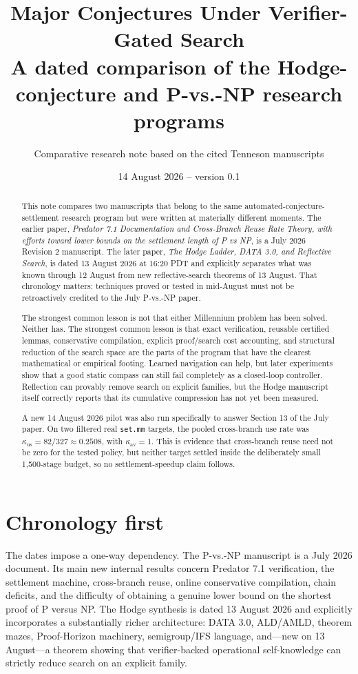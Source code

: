 \documentclass[11pt]{article}
\title{\textbf{Major Conjectures Under Verifier-Gated Search}\\[0.3em]
\large A dated comparison of the Hodge-conjecture and P-vs.-NP research programs}
\author{Comparative research note based on the cited Tenneson manuscripts}
\date{14 August 2026 -- version 0.1}
\newcommand{\kuse}{\kappa_{\mathrm{us}}}
\newcommand{\kav}{\kappa_{\mathrm{av}}}
\begin{document}
\maketitle

\begin{abstract}
This note compares two manuscripts that belong to the same automated-conjecture-settlement research program but were written at materially different moments.  The earlier paper, \emph{Predator 7.1 Documentation and Cross-Branch Reuse Rate Theory, with efforts toward lower bounds on the settlement length of P vs NP}, is a July 2026 Revision 2 manuscript.  The later paper, \emph{The Hodge Ladder, DATA 3.0, and Reflective Search}, is dated 13 August 2026 at 16:20 PDT and explicitly separates what was known through 12 August from new reflective-search theorems of 13 August.  That chronology matters: techniques proved or tested in mid-August must not be retroactively credited to the July P-vs.-NP paper.

The strongest common lesson is not that either Millennium problem has been solved.  Neither has.  The strongest common lesson is that exact verification, reusable certified lemmas, conservative compilation, explicit proof/search cost accounting, and structural reduction of the search space are the parts of the program that have the clearest mathematical or empirical footing.  Learned navigation can help, but later experiments show that a good static compass can still fail completely as a closed-loop controller.  Reflection can provably remove search on explicit families, but the Hodge manuscript itself correctly reports that its cumulative compression has not yet been measured.

A new 14 August 2026 pilot was also run specifically to answer Section 13 of the July paper.  On two filtered real \texttt{set.mm} targets, the pooled cross-branch use rate was \(\kuse=82/327\approx0.2508\), with \(\kav=1\).  This is evidence that cross-branch reuse need not be zero for the tested policy, but neither target settled inside the deliberately small 1,500-stage budget, so no settlement-speedup claim follows.
\end{abstract}

\section{Chronology first}

The dates impose a one-way dependency.  The P-vs.-NP manuscript is a July 2026 document.  Its main new internal results concern Predator 7.1 verification, the settlement machine, cross-branch reuse, online conservative compilation, chain deficits, and the difficulty of obtaining a genuine lower bound on the shortest proof of P versus NP.  The Hodge synthesis is dated 13 August 2026 and explicitly incorporates a substantially richer architecture: DATA 3.0, ALD/AMLD, theorem mazes, Proof-Horizon machinery, semigroup/IFS language, and---new on 13 August---a theorem showing that verifier-backed operational self-knowledge can strictly reduce search on an explicit family.
\end{document}
